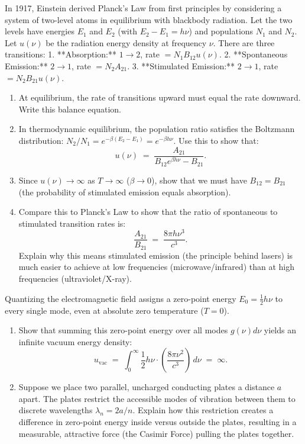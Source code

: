 \documentclass[12pt, a4paper, twoside]{book}
\newcounter{problem}[chapter]
\begin{document}
\begin{deepproblem}
In 1917, Einstein derived Planck's Law from first principles by considering a system of two-level atoms in equilibrium with blackbody radiation.
Let the two levels have energies $E_1$ and $E_2$ (with $E_2 - E_1 = h\nu$) and populations $N_1$ and $N_2$. Let $u(\nu)$ be the radiation energy density at frequency $\nu$.
There are three transitions:
1. **Absorption:** $1 \to 2$, rate $= N_1 B_{12} u(\nu)$.
2. **Spontaneous Emission:** $2 \to 1$, rate $= N_2 A_{21}$.
3. **Stimulated Emission:** $2 \to 1$, rate $= N_2 B_{21} u(\nu)$.
\begin{enumerate}[label=(\alph*)]
  \item At equilibrium, the rate of transitions upward must equal the rate downward. Write this balance equation.
  \item In thermodynamic equilibrium, the population ratio satisfies the Boltzmann distribution: $N_2/N_1 = e^{-\beta(E_2 - E_1)} = e^{-\beta h\nu}$. Use this to show that:
  \[
    u(\nu) \;=\; \frac{A_{21}}{B_{12} e^{\beta h\nu} - B_{21}}.
  \]
  \item Since $u(\nu) \to \infty$ as $T \to \infty$ ($\beta \to 0$), show that we must have $B_{12} = B_{21}$ (the probability of stimulated emission equals absorption).
  \item Compare this to Planck's Law to show that the ratio of spontaneous to stimulated transition rates is:
  \[
    \frac{A_{21}}{B_{21}} \;=\; \frac{8\pi h \nu^3}{c^3}.
  \]
  Explain why this means stimulated emission (the principle behind lasers) is much easier to achieve at low frequencies (microwave/infrared) than at high frequencies (ultraviolet/X-ray).
\end{enumerate}
\end{deepproblem}

\begin{deepproblem}
Quantizing the electromagnetic field assigns a zero-point energy $E_0 = \frac{1}{2}h\nu$ to every single mode, even at absolute zero temperature ($T=0$).
\begin{enumerate}[label=(\alph*)]
  \item Show that summing this zero-point energy over all modes $g(\nu) d\nu$ yields an infinite vacuum energy density:
  \[
    u_{\text{vac}} \;=\; \int_0^\infty \frac{1}{2}h\nu \cdot \left(\frac{8\pi \nu^2}{c^3}\right) \, d\nu \;=\; \infty.
  \]
  \item Suppose we place two parallel, uncharged conducting plates a distance $a$ apart. The plates restrict the accessible modes of vibration between them to discrete wavelengths $\lambda_n = 2a/n$.
  Explain how this restriction creates a difference in zero-point energy inside versus outside the plates, resulting in a measurable, attractive force (the Casimir Force) pulling the plates together.
\end{enumerate}
\end{deepproblem}
\end{document}
